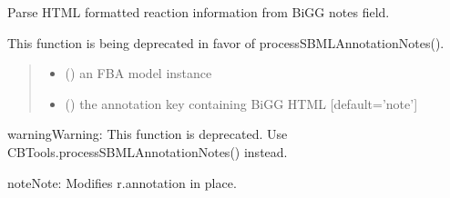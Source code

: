 \documentclass[letterpaper,12pt,english]{sphinxmanual}
\begin{document}

\begin{fulllineitems}
\label{\detokenize{api/core:cbmpy.CBTools.processBiGGannotationNote}}
\pysigstartsignatures
\pysiglinewithargsret
{}
{\sphinxparamcomma {}}
{}
\pysigstopsignatures
\sphinxAtStartPar
Parse HTML formatted reaction information from BiGG notes field.

\sphinxAtStartPar
This function is being deprecated in favor of processSBMLAnnotationNotes().
\begin{quote}\begin{description}
\begin{itemize}
\item {} 
\sphinxAtStartPar
{} () \textendash{} an FBA model instance

\item {} 
\sphinxAtStartPar
{} (\sphinxstyleliteralemphasis{\sphinxupquote{, }}) \textendash{} the annotation key containing BiGG HTML {[}default=’note’{]}

\end{itemize}

\end{description}\end{quote}

\begin{sphinxadmonition}{warning}{Warning:}
\sphinxAtStartPar
This function is deprecated. Use CBTools.processSBMLAnnotationNotes() instead.
\end{sphinxadmonition}

\begin{sphinxadmonition}{note}{Note:}
\sphinxAtStartPar
Modifies r.annotation in place.
\end{sphinxadmonition}

\end{fulllineitems}
\end{document}
